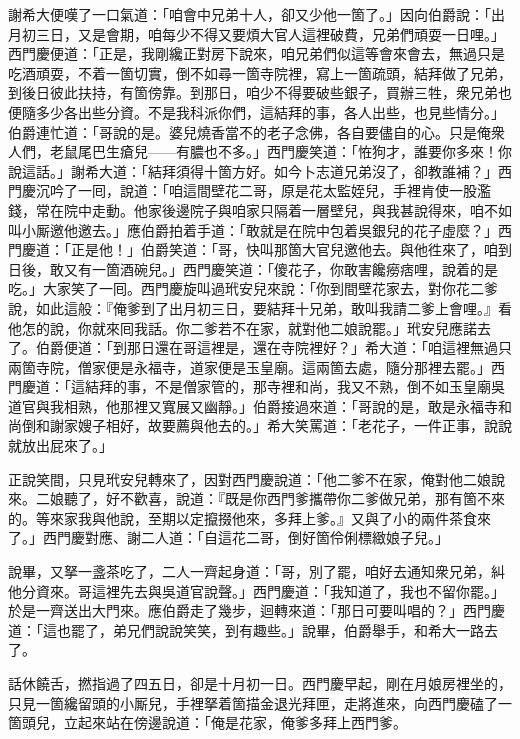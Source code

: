 謝希大便嘆了一口氣道：「咱會中兄弟十人，卻又少他一箇了。」因向伯爵說：「出月初三日，又是會期，咱每少不得又要煩大官人這裡破費，兄弟們頑耍一日哩。」西門慶便道：「正是，我剛纔正對房下說來，咱兄弟們似這等會來會去，無過只是吃酒頑耍，不着一箇切實，倒不如尋一箇寺院裡，寫上一箇疏頭，結拜做了兄弟，到後日彼此扶持，有箇傍靠。到那日，咱少不得要破些銀子，買辦三牲，衆兄弟也便隨多少各出些分資。不是我科派你們，這結拜的事，各人出些，也見些情分。」伯爵連忙道：「哥說的是。婆兒燒香當不的老子念佛，各自要儘自的心。只是俺衆人們，老鼠尾巴生瘡兒——有膿也不多。」西門慶笑道：「恠狗才，誰要你多來！你說這話。」謝希大道：「結拜須得十箇方好。如今卜志道兄弟沒了，卻教誰補？」西門慶沉吟了一囘，說道：「咱這間壁花二哥，原是花太監姪兒，手裡肯使一股濫錢，常在院中走動。他家後邊院子與咱家只隔着一層壁兒，{}與我甚說得來，咱不如叫小厮邀他邀去。」應伯爵拍着手道：「敢就是在院中包着吳銀兒的花子虛麼？」西門慶道：「正是他！」伯爵笑道：「哥，快叫那箇大官兒邀他去。{}與他徃來了，咱到日後，敢又有一箇酒碗兒。」西門慶笑道：「傻花子，你敢害饞癆痞哩，說着的是吃。」大家笑了一囘。西門慶旋叫過玳安兒來說：「你到間壁花家去，對你花二爹說，如此這般：『俺爹到了出月初三日，要結拜十兄弟，敢叫我請二爹上會哩。』看他怎的說，你就來囘我話。你二爹若不在家，就對他二娘說罷。」玳安兒應諾去了。伯爵便道：「到那日還在哥這裡是，還在寺院裡好？」希大道：「咱這裡無過只兩箇寺院，僧家便是永福寺，道家便是玉皇廟。{}這兩箇去處，隨分那裡去罷。」西門慶道：「這結拜的事，不是僧家管的，那寺裡和尚，我又不熟，倒不如玉皇廟吳道官與我相熟，他那裡又寬展又幽靜。」伯爵接過來道：「哥說的是，敢是永福寺和尚倒和謝家嫂子相好，故要薦與他去的。」希大笑罵道：「老花子，一件正事，說說就放出屁來了。」

正說笑間，只見玳安兒轉來了，因對西門慶說道：「他二爹不在家，俺對他二娘說來。二娘聽了，好不歡喜，{}說道：『既是你西門爹攜帶你二爹做兄弟，那有箇不來的。{}等來家我與他說，至期以定攛掇他來，多拜上爹。』又與了小的兩件茶食來了。」{}西門慶對應、謝二人道：「自這花二哥，倒好箇伶俐標緻娘子兒。」{}

說畢，又拏一盞茶吃了，二人一齊起身道：「哥，別了罷，咱好去通知衆兄弟，糾他分資來。哥這裡先去與吳道官說聲。」西門慶道：「我知道了，我也不留你罷。」於是一齊送出大門來。應伯爵走了幾步，迴轉來道：「那日可要叫唱的？」西門慶道：「這也罷了，弟兄們說說笑笑，到有趣些。」說畢，伯爵舉手，和希大一路去了。

話休饒舌，撚指過了四五日，卻是十月初一日。西門慶早起，剛在月娘房裡坐的，只見一箇纔留頭的小厮兒，手裡拏着箇描金退光拜匣，走將進來，向西門慶磕了一箇頭兒，立起來站在傍邊說道：「俺是花家，俺爹多拜上西門爹。

